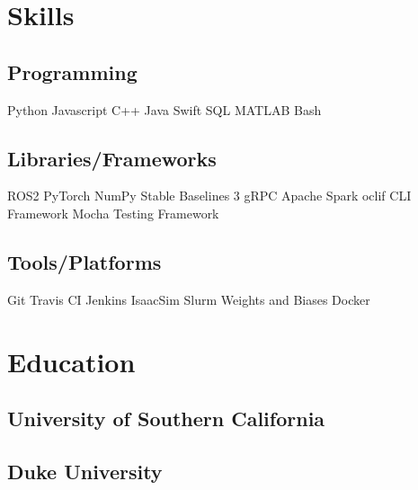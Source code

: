 \documentclass[]{plushcv}
\begin{document}
\begin{minipage}[t]{0.25\textwidth} 


\section{Skills}
\subsection{Programming}
\sectionsep
Python \textbullet{} Javascript \textbullet{} C++ \textbullet{} Java \textbullet{} Swift \textbullet{} SQL \textbullet{} MATLAB \textbullet{} Bash

\sectionsep
\sectionsep

\subsection{Libraries/Frameworks}
\sectionsep
ROS2 \textbullet{} PyTorch \textbullet{} NumPy \textbullet{} Stable Baselines 3 \textbullet{} gRPC \textbullet{} Apache Spark \textbullet{} oclif CLI Framework \textbullet{} Mocha Testing Framework 

\sectionsep
\sectionsep

\subsection{Tools/Platforms}
\sectionsep
Git \textbullet{} Travis CI \textbullet{} Jenkins \textbullet{}  IsaacSim \textbullet{} Slurm \textbullet{} Weights and Biases \textbullet{} Docker 


\section{Education} 
\subsection{University of Southern California}

\sectionsep
\sectionsep

\subsection{Duke University}


\end{minipage}
\end{document}
